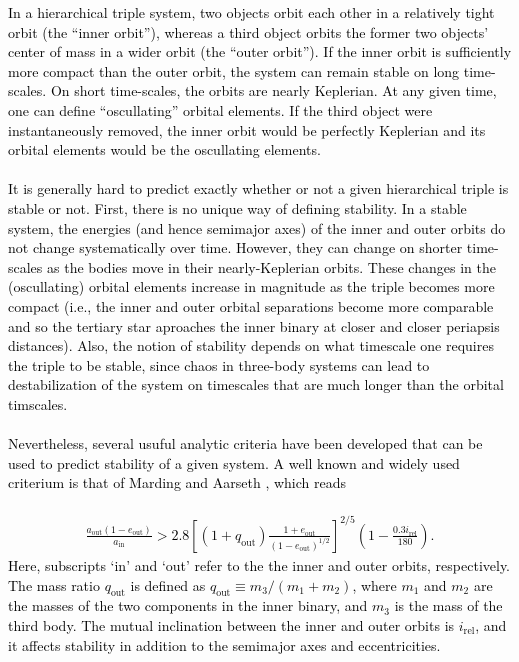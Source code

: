 \documentclass[main.tex]{subfiles}
\begin{document}
\begin{tcolorbox}[sharp corners, colback=blue!30, colframe=blue!80!blue,  title=Stability of hierarchical triples$^8$]
\par \textcolor{black}{ In a hierarchical triple system, two objects orbit each other in a relatively tight orbit (the ``inner orbit''), whereas a third object orbits the former two objects' center of mass in a wider orbit (the ``outer orbit''). If the inner orbit is sufficiently more compact than the outer orbit, the system can remain stable on long time-scales. On short time-scales, the orbits are nearly Keplerian. At any given time, one can define ``oscullating'' orbital elements. If the third object were instantaneously removed, the inner orbit would be perfectly Keplerian and its orbital elements would be the oscullating elements. \\ \\
It is generally hard to predict exactly whether or not a given hierarchical triple is stable or not. First, there is no unique way of defining stability. In a stable system, the energies (and hence semimajor axes) of the inner and outer orbits do not change systematically over time. However, they can change on shorter time-scales as the bodies move in their nearly-Keplerian orbits. These changes in the (oscullating) orbital elements increase in magnitude as the triple becomes more compact (i.e., the inner and outer orbital separations become more comparable and so the tertiary star aproaches the inner binary at closer and closer periapsis distances).  Also, the notion of stability depends on what timescale one requires the triple to be stable, since chaos in three-body systems can lead to destabilization of the system on timescales that are much longer than the orbital timscales. \\ \\
Nevertheless, several usuful analytic criteria have been developed that can be used to predict stability of a given system. A well known and widely used criterium is that of Marding and Aarseth \citep{}, which reads \\ \\
\begin{align}
\frac{a_{\mathrm{out}}(1-e_{\mathrm{out}})}{a_{\mathrm{in}}} > 2.8 \left [ (1 + q_{\mathrm{out}}) \frac{1+e_{\mathrm{out}}}{(1 - e_{\mathrm{out}})^{1/2}} \right ]^{2/5} \left (1 - \frac{0.3 i_{\mathrm{rel}}}{180} \right ).
\end{align}
Here, subscripts `in' and `out' refer to the the inner and outer orbits, respectively. The mass ratio $q_{\mathrm{out}}$ is defined as $q_{\mathrm{out}} \equiv m_3/(m_1+m_2)$, where $m_1$ and $m_2$ are the masses of the two components in the inner binary, and $m_3$ is the mass of the third body. The mutual inclination between the inner and outer orbits is $i_{\mathrm{rel}}$, and it affects stability in addition to the semimajor axes and eccentricities.
}
\end{tcolorbox}
\end{document}
